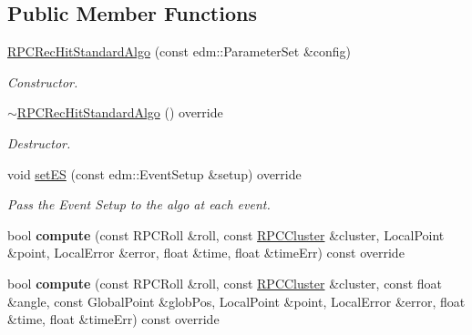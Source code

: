 \subsection*{Public Member Functions}
\begin{DoxyCompactItemize}
\item 
\hypertarget{classRPCRecHitStandardAlgo_a9c217d736f5afc104990d32a9ab12d26}{\hyperlink{classRPCRecHitStandardAlgo_a9c217d736f5afc104990d32a9ab12d26}{R\-P\-C\-Rec\-Hit\-Standard\-Algo} (const edm\-::\-Parameter\-Set \&config)}\label{classRPCRecHitStandardAlgo_a9c217d736f5afc104990d32a9ab12d26}

\begin{DoxyCompactList}\small\item\em Constructor. \end{DoxyCompactList}\item 
\hypertarget{classRPCRecHitStandardAlgo_aca26b5e3675d5db683fe34258e4b39a8}{\hyperlink{classRPCRecHitStandardAlgo_aca26b5e3675d5db683fe34258e4b39a8}{$\sim$\-R\-P\-C\-Rec\-Hit\-Standard\-Algo} () override}\label{classRPCRecHitStandardAlgo_aca26b5e3675d5db683fe34258e4b39a8}

\begin{DoxyCompactList}\small\item\em Destructor. \end{DoxyCompactList}\item 
\hypertarget{classRPCRecHitStandardAlgo_ae0d0524dd4f39ba36c35ac3f9247f0f5}{void \hyperlink{classRPCRecHitStandardAlgo_ae0d0524dd4f39ba36c35ac3f9247f0f5}{set\-E\-S} (const edm\-::\-Event\-Setup \&setup) override}\label{classRPCRecHitStandardAlgo_ae0d0524dd4f39ba36c35ac3f9247f0f5}

\begin{DoxyCompactList}\small\item\em Pass the Event Setup to the algo at each event. \end{DoxyCompactList}\item 
\hypertarget{classRPCRecHitStandardAlgo_aa1d9a7d6100cc6b4702a1797da2c1b21}{bool {\bfseries compute} (const R\-P\-C\-Roll \&roll, const \hyperlink{classRPCCluster}{R\-P\-C\-Cluster} \&cluster, Local\-Point \&point, Local\-Error \&error, float \&time, float \&time\-Err) const override}\label{classRPCRecHitStandardAlgo_aa1d9a7d6100cc6b4702a1797da2c1b21}

\item 
\hypertarget{classRPCRecHitStandardAlgo_a308f50dbd6a9bc77893514818b2f1430}{bool {\bfseries compute} (const R\-P\-C\-Roll \&roll, const \hyperlink{classRPCCluster}{R\-P\-C\-Cluster} \&cluster, const float \&angle, const Global\-Point \&glob\-Pos, Local\-Point \&point, Local\-Error \&error, float \&time, float \&time\-Err) const override}\label{classRPCRecHitStandardAlgo_a308f50dbd6a9bc77893514818b2f1430}

\end{DoxyCompactItemize}


